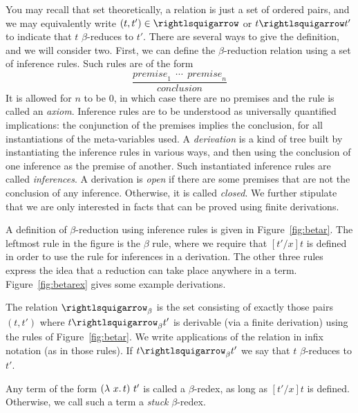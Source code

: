You may recall that set theoretically, a relation is just a set of
ordered pairs, and we may equivalently write $(t,t')\in\curva$ or $t
\curva t'$ to indicate that $t$ $\beta$-reduces to $t'$.  There are
several ways to give the definition, and we will consider two.
First, we can define the $\beta$-reduction relation using a set of inference rules.
Such rules are of the form
\[
\frac{\textit{premise}_1 \ \ \cdots \ \ \textit{premise}_n}{\textit{conclusion}}
\]
\noindent It is allowed for $n$ to be $0$, in which case there are no
premises and the rule is called an \emph{axiom}.  Inference rules are
to be understood as universally quantified implications: the
conjunction of the premises implies the conclusion, for all
instantiations of the meta-variables used.  A \emph{derivation} is a
kind of tree built by instantiating the inference rules in various
ways, and then using the conclusion of one inference as the premise of
another.  Such instantiated inference rules are
called \emph{inferences}.  A derivation is
\emph{open} if there are some premises that are not the conclusion of
any inference.  Otherwise, it is called
\emph{closed}. We further stipulate that we
are only interested in facts that can be proved using finite
derivations.  

A definition of $\beta$-reduction using inference rules is given in
Figure~\ref{fig:betar}.  The leftmost rule in the figure is the
$\beta$ rule, where we require that $[t'/x]t$ is defined
in order to use the rule for inferences in a derivation.  The other
three rules express the idea that a reduction can take place anywhere
in a term.  Figure~\ref{fig:betarex} gives some example derivations.

\begin{definition}
\label{def:beta}
The relation $\curva_\beta$ is the set consisting of exactly those
pairs $(t,t')$ where $t \curva_\beta t'$ is derivable (via a finite derivation) using the
rules of Figure~\ref{fig:betar}.  We write applications of the
relation in infix notation (as in those rules).  If $t \curva_\beta t'$
we say that $t$ $\beta$-reduces to $t'$.  
\end{definition}

\begin{definition}
  Any term of the form $(\lam{x}{t})\ t'$ is called a $\beta$-redex,
  as long as $[t'/x]t$ is defined.  Otherwise, we call such a term
  a \emph{stuck} $\beta$-redex.
  \end{definition}

